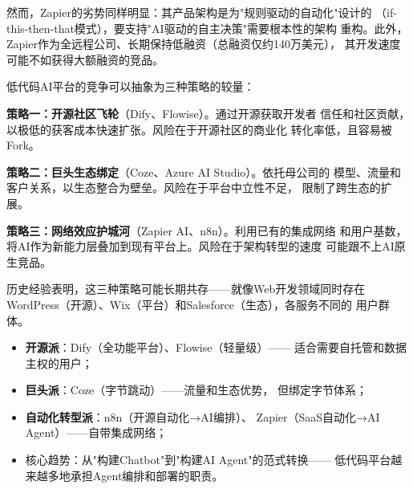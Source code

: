 然而，Zapier的劣势同样明显：其产品架构是为"规则驱动的自动化"设计的
（if-this-then-that模式），要支持"AI驱动的自主决策"需要根本性的架构
重构。此外，Zapier作为全远程公司、长期保持低融资（总融资仅约140万美元），
其开发速度可能不如获得大额融资的竞品。

\begin{whybox}[低代码AI平台的三种竞争策略]
低代码AI平台的竞争可以抽象为三种策略的较量：

\textbf{策略一：开源社区飞轮}（Dify、Flowise）。通过开源获取开发者
信任和社区贡献，以极低的获客成本快速扩张。风险在于开源社区的商业化
转化率低，且容易被Fork。

\textbf{策略二：巨头生态绑定}（Coze、Azure AI Studio）。依托母公司的
模型、流量和客户关系，以生态整合为壁垒。风险在于平台中立性不足，
限制了跨生态的扩展。

\textbf{策略三：网络效应护城河}（Zapier AI、n8n）。利用已有的集成网络
和用户基数，将AI作为新能力层叠加到现有平台上。风险在于架构转型的速度
可能跟不上AI原生竞品。

历史经验表明，这三种策略可能长期共存——就像Web开发领域同时存在
WordPress（开源）、Wix（平台）和Salesforce（生态），各服务不同的
用户群体。
\end{whybox}

\begin{corebox}[低代码AI平台竞争格局]
\begin{itemize}
  \item \textbf{开源派}：Dify（全功能平台）、Flowise（轻量级）——
    适合需要自托管和数据主权的用户；
  \item \textbf{巨头派}：Coze（字节跳动）——流量和生态优势，
    但绑定字节体系；
  \item \textbf{自动化转型派}：n8n（开源自动化→AI编排）、
    Zapier（SaaS自动化→AI Agent）——自带集成网络；
  \item 核心趋势：从"构建Chatbot"到"构建AI Agent"的范式转换——
    低代码平台越来越多地承担Agent编排和部署的职责。
\end{itemize}
\end{corebox}

